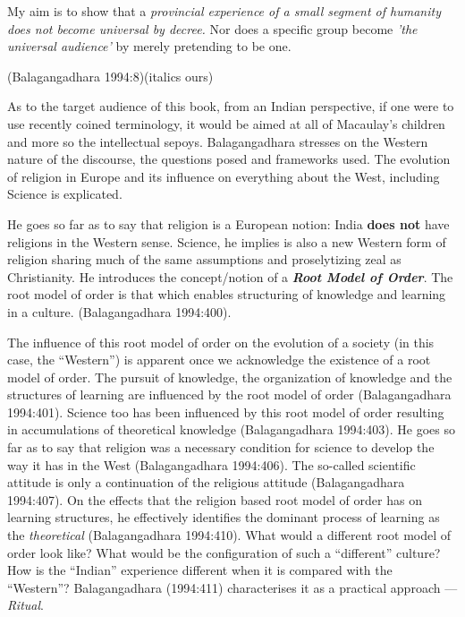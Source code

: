 \begin{myquote}
My aim is to show that a \textit{provincial experience of a small segment of humanity does not become universal by decree.} Nor does a specific group become \textit{'the universal audience'} by merely pretending to be one.
\end{myquote}

\hfill (Balagangadhara 1994:8)(italics ours)

As to the target audience of this book, from an Indian perspective, if one were to use recently coined terminology, it would be aimed at all of Macaulay's children and more so the intellectual sepoys. Balagangadhara stresses on the Western nature of the discourse, the questions posed and frameworks used. The evolution of religion in Europe and its influence on everything about the West, including Science is explicated.

He goes so far as to say that religion is a European notion: India \textbf{does not} have religions in the Western sense. Science, he implies is also a new Western form of religion sharing much of the same assumptions and proselytizing zeal as Christianity. He introduces the concept/notion of a \textbf{\textit{Root Model of Order}}. The root model of order is that which enables structuring of knowledge and learning in a culture. (Balagangadhara 1994:400).

The influence of this root model of order on the evolution of a society (in this case, the “Western”) is apparent once we acknowledge the existence of a root model of order. The pursuit of knowledge, the organization of knowledge and the structures of learning are influenced by the root model of order (Balagangadhara 1994:401). Science too has been influenced by this root model of order resulting in accumulations of theoretical knowledge (Balagangadhara 1994:403). He goes so far as to say that religion was a necessary condition for science to develop the way it has in the West (Balagangadhara 1994:406). The so-called scientific attitude is only a continuation of the religious attitude (Balagangadhara 1994:407). On the effects that the religion based root model of order has on learning structures, he effectively identifies the dominant process of learning as the \textit{theoretical} (Balagangadhara 1994:410). What would a different root model of order look like? What would be the configuration of such a “different” culture? How is the “Indian” experience different when it is compared with the “Western”? Balagangadhara (1994:411) characterises it as a practical approach — \textit{Ritual}.


